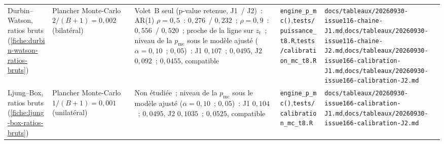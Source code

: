 \documentclass[a4paper,11pt]{article}
\newcommand{\code}[1]{\texttt{\small #1}}
\begin{document}
\begin{landscape}
\begin{center}
\begin{longtable}{@{}>{\raggedright\arraybackslash}p{2.5cm}>{\raggedright\arraybackslash}p{3.6cm}>{\raggedright\arraybackslash}p{4.0cm}>{\raggedright\arraybackslash}p{6.7cm}>{\raggedright\arraybackslash}p{7.2cm}@{}}
Durbin--Watson, ratios bruts (\ref{fiche:durbin-watson-ratios-bruts}) & Plancher Monte-Carlo $2/(B+1) = 0{,}002$ (bilatéral) & Volet~B seul (p-value retenue, J1~/ J2)~: AR(1) $\rho = 0{,}5$~: $0{,}276$~/ $0{,}232$~; $\rho = 0{,}9$~: $0{,}556$~/ $0{,}520$~; proche de la ligne sur $z_t$~; niveau de la $p_{\mathrm{mc}}$ sous le modèle ajusté ($\alpha = 0{,}10$~; $0{,}05$)~: J1 $0{,}107$~; $0{,}0495$, J2 $0{,}092$~; $0{,}0455$, compatible & \code{engine\_p\_mc()},\newline \code{tests/puissance\_t8.R},\newline \code{tests/calibration\_mc\_t8.R} & \code{docs/tableaux/}\newline \code{20260930-issue116-chaine-J1.md},\newline \code{docs/tableaux/}\newline \code{20260930-issue116-chaine-J2.md},\newline \code{docs/tableaux/}\newline \code{20260930-issue166-calibration-J1.md},\newline \code{docs/tableaux/}\newline \code{20260930-issue166-calibration-J2.md} \\
Ljung--Box, ratios bruts (\ref{fiche:ljung-box-ratios-bruts}) & Plancher Monte-Carlo $1/(B+1) = 0{,}001$ (unilatéral) & Non étudiée~; niveau de la $p_{\mathrm{mc}}$ sous le modèle ajusté ($\alpha = 0{,}10$~; $0{,}05$)~: J1 $0{,}104$~; $0{,}0495$, J2 $0{,}1035$~; $0{,}0525$, compatible & \code{engine\_p\_mc()},\newline \code{tests/calibration\_mc\_t8.R} & \code{docs/tableaux/}\newline \code{20260930-issue166-calibration-J1.md},\newline \code{docs/tableaux/}\newline \code{20260930-issue166-calibration-J2.md} \\

\end{longtable}
\end{center}
\end{landscape}
\end{document}

